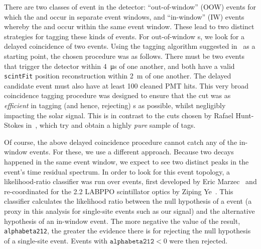 There are two classes of  event in the detector: ``out-of-window'' (OOW) events for which the  and  occur in separate event windows, and ``in-window'' (IW) events whereby the  and  occur within the same event window. These lead to two distinct strategies for tagging these kinds of events. For out-of-window s, we look for a delayed coincidence of two events. Using the tagging algorithm suggested in~\cite{} %
as a starting point, the chosen procedure was as follows. There must be two events that trigger the detector within \SI{4}{\micro\second} of one another, and both have a valid \texttt{scintFit} position reconstruction within \SI{2}{\metre} of one another. The delayed candidate event must also have at least 100 cleaned PMT hits. %
This very broad coincidence tagging procedure was designed to ensure that the cut was as \textit{efficient} in tagging (and hence, rejecting) s as possible, whilst negligibly impacting the solar signal. This is in contrast to the cuts chosen by Rafael Hunt-Stokes in~\cite{}, %
which try and obtain a highly \textit{pure} sample of  tags.

Of course, the above delayed coincidence procedure cannot catch any of the in-window  events. For these, we use a different approach. Because two decays happened in the same event window, we expect to see two distinct peaks in the event's time residual spectrum. In order to look for this event topology, a likelihood-ratio classifier was run over events, first developed by Eric Marzec~\cite{} %
and re-coordinated for the \SI{2.2}{\gpl} LABPPO scintillator optics by Ziping Ye~\cite{}. %
This classifier calculates the likelihood ratio between the null hypothesis of a \onbb{} event (a proxy in this analysis for single-site events such as our \beight{} signal) and the alternative hypothesis of an in-window  event. The more negative the value of the result, \texttt{alphabeta212}, the greater the evidence there is for rejecting the null hypothesis of a single-site event. Events with $\texttt{alphabeta212} < 0$ %
were then rejected.

